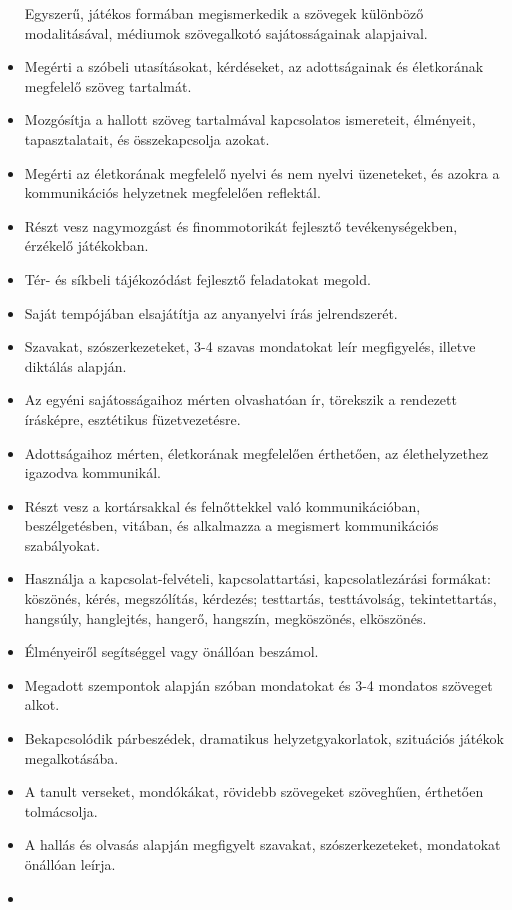 \begin{itemize}
  Egyszerű, játékos formában megismerkedik a szövegek különböző
  modalitásával, médiumok szövegalkotó sajátosságainak alapjaival.
\item
  Megérti a szóbeli utasításokat, kérdéseket, az adottságainak és
  életkorának megfelelő szöveg tartalmát.
\item
  Mozgósítja a hallott szöveg tartalmával kapcsolatos ismereteit,
  élményeit, tapasztalatait, és összekapcsolja azokat.
\item
  Megérti az életkorának megfelelő nyelvi és nem nyelvi üzeneteket, és
  azokra a kommunikációs helyzetnek megfelelően reflektál.
\item
  Részt vesz nagymozgást és finommotorikát fejlesztő tevékenységekben,
  érzékelő játékokban.
\item
  Tér- és síkbeli tájékozódást fejlesztő feladatokat megold.
\item
  Saját tempójában elsajátítja az anyanyelvi írás jelrendszerét.
\item
  Szavakat, szószerkezeteket, 3-4 szavas mondatokat leír megfigyelés,
  illetve diktálás alapján.
\item
  Az egyéni sajátosságaihoz mérten olvashatóan ír, törekszik a rendezett
  írásképre, esztétikus füzetvezetésre.
\item
  Adottságaihoz mérten, életkorának megfelelően érthetően, az
  élethelyzethez igazodva kommunikál.
\item
  Részt vesz a kortársakkal és felnőttekkel való kommunikációban,
  beszélgetésben, vitában, és alkalmazza a megismert kommunikációs
  szabályokat.
\item
  Használja a kapcsolat-felvételi, kapcsolattartási, kapcsolatlezárási
  formákat: köszönés, kérés, megszólítás, kérdezés; testtartás,
  testtávolság, tekintettartás, hangsúly, hanglejtés, hangerő, hangszín,
  megköszönés, elköszönés.
\item
  Élményeiről segítséggel vagy önállóan beszámol.
\item
  Megadott szempontok alapján szóban mondatokat és 3-4 mondatos szöveget
  alkot.
\item
  Bekapcsolódik párbeszédek, dramatikus helyzetgyakorlatok, szituációs
  játékok megalkotásába.
\item
  A tanult verseket, mondókákat, rövidebb szövegeket szöveghűen,
  érthetően tolmácsolja.
\item
  A hallás és olvasás alapján megfigyelt szavakat, szószerkezeteket,
  mondatokat önállóan leírja.
\item

\end{itemize}
